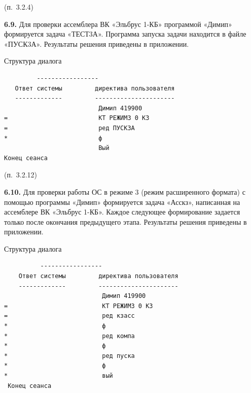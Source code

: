 \documentclass[11pt,a4paper]{article}
\begin{document}
\begin{center}(п.~3.2.4)\end{center}
\par\textbf{6.9.} Для проверки ассемблера ВК «Эльбрус 1-КБ» программой «Димип» формируется задача «ТЕСТ3А». Программа запуска задачи находится в файле «ПУСК3А». Результаты решения приведены в приложении.\par
\begin{center}Структура диалога\end{center}
\begin{center}\small
\begin{BVerbatim}
         -----------------
   Ответ системы         директива пользователя
   -------------         ----------------------
                          Димип 419900
=                         КТ РЕЖИМ3 0 КЗ
=                         ред ПУСК3А
*                         ф
                          Вый
Конец сеанса
\end{BVerbatim}
\end{center}

\begin{center}(п.~3.2.12)\end{center}
\par\textbf{6.10.} Для проверки работы ОС в режиме 3 (режим расширенного формата) с помощью программы «Димип» формируется задача «Асскз», написанная на ассемблере ВК «Эльбрус 1-КБ». Каждое следующее формирование задается только после окончания предыдущего этапа. Результаты решения приведены в приложении.\par
\begin{center}Структура диалога\end{center}
\begin{center}\small
\begin{BVerbatim}
          -----------------
    Ответ системы         директива пользователя
    -------------         ----------------------
                           Димип 419900
=                          КТ РЕЖИМ3 0 КЗ
=                          ред кзасс
*                          ф
*                          ред компа
*                          ф
*                          ред пуска
*                          ф
*                          вый
 Конец сеанса
\end{BVerbatim}
\end{center}
\end{document}
